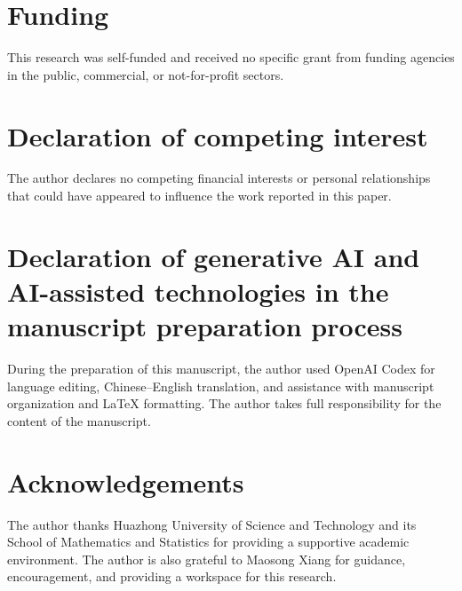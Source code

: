 \documentclass[11pt,a4paper]{article}
\theoremstyle{remark}
\numberwithin{equation}{section}
\begin{document}
\section*{Funding}
This research was self-funded and received no specific grant from
funding agencies in the public, commercial, or not-for-profit sectors.

\section*{Declaration of competing interest}
The author declares no competing financial interests or personal
relationships that could have appeared to influence the work
reported in this paper.

\section*{Declaration of generative AI and AI-assisted technologies in the manuscript preparation process}
During the preparation of this manuscript, the author used OpenAI
Codex for language editing, Chinese--English translation, and
assistance with manuscript organization and LaTeX formatting.
The author takes full responsibility for the content of the manuscript.

\section*{Acknowledgements}
The author thanks Huazhong University of Science and Technology and
its School of Mathematics and Statistics for providing a supportive
academic environment. The author is also grateful to Maosong Xiang
for guidance, encouragement, and providing a workspace for this research.
\end{document}
